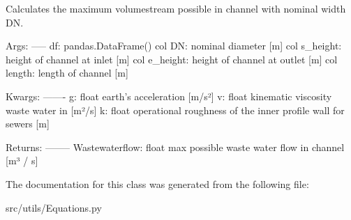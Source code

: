 \begin{DoxyVerb}Calculates the maximum volumestream possible in channel with
nominal width DN.

Args:
-----
df: pandas.DataFrame()
    col DN: nominal diameter [m]
    col s_height: height of channel at inlet [m]
    col e_height: height of channel at outlet [m]
    col length: length of channel [m]

Kwargs:
-------
g: float
    earth's acceleration [m/s²] \n
v: float
    kinematic viscosity waste water in [m²/s]
k: float
    operational roughness of the inner profile wall for sewers [m]

Returns:
--------
Wastewaterflow: float
    max possible waste water flow in channel [m³ / s]
\end{DoxyVerb}
 

The documentation for this class was generated from the following file\+:\begin{DoxyCompactItemize}
\item 
src/utils/Equations.\+py\end{DoxyCompactItemize}

